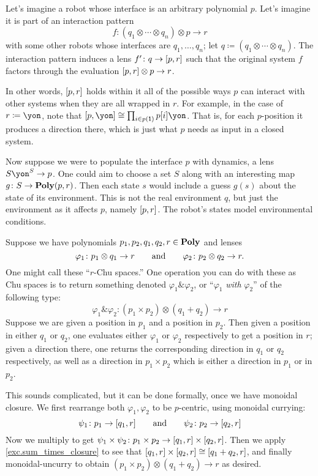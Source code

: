 \documentclass[Book-Poly]{subfiles}
\begin{document}
\begin{example}
Let's imagine a robot whose interface is an arbitrary polynomial $p$. Let's imagine it is part of an interaction pattern
\[
	f\colon (q_1\otimes\cdots\otimes q_n)\otimes p\to r
\]
with some other robots whose interfaces are $q_1,\ldots,q_n$; let $q\coloneqq(q_1\otimes\cdots\otimes q_n)$. The interaction pattern induces a lens $f'\colon q\to [p,r]$ such that the original system $f$ factors through the evaluation $[p,r]\otimes p\to r$.

In other words, $[p,r]$ holds within it all of the possible ways $p$ can interact with other systems when they are all wrapped in $r$.
For example, in the case of $r\coloneqq\yon$, note that $\ihom{p,\yon}\cong\prod_{i\in p(\1)}p[i]\yon$.
That is, for each $p$-position it produces a direction there, which is just what $p$ needs as input in a closed system.


Now suppose we were to populate the interface $p$ with dynamics, a lens $S\yon^S\to p$. One could aim to choose a set $S$ along with an interesting map $g\colon S\to\mathbf{Poly}(p,r)$. Then each state $s$ would include a guess $g(s)$ about the state of its environment. This is not the real environment $q$, but just the environment as it affects $p$, namely $[p,r]$. The robot's states model environmental conditions.
\end{example}

\begin{example}[Chu $\&$]
Suppose we have polynomials $p_1,p_2,q_1,q_2,r\in\mathbf{Poly}$ and lenses
\[
	\varphi_1\colon p_1\otimes q_1\to r
	\qquad\text{and}\qquad
	\varphi_2\colon p_2\otimes q_2\to r.
\]
One might call these ``$r$-Chu spaces.'' One operation you can do with these as Chu spaces is to return something denoted $\varphi_1\&\varphi_2$, or ``$\varphi_1$ \emph{with} $\varphi_2$'' of the following type:
\[
\varphi_1\&\varphi_2\colon (p_1\times p_2)\otimes (q_1+q_2)\to r
\]
Suppose we are given a position in $p_1$ and a position in $p_2$. Then given a position in either $q_1$ or $q_2$, one evaluates either $\varphi_1$ or $\varphi_2$ respectively to get a position in $r$; given a direction there, one returns the corresponding direction in $q_1$ or $q_2$ respectively, as well as a direction in $p_1\times p_2$ which is either a direction in $p_1$ or in $p_2$.

This sounds complicated, but it can be done formally, once we have monoidal closure. We first rearrange both $\varphi_1,\varphi_2$ to be $p$-centric, using monoidal currying:
\[
\psi_1\colon p_1\to [q_1,r]
\qquad\text{and}\qquad
\psi_2\colon p_2\to [q_2,r]
\]
Now we multiply to get $\psi_1\times\psi_2\colon p_1\times p_2\to[q_1,r]\times[q_2,r]$. Then we apply \cref{exc.sum_times_closure} to see that $[q_1,r]\times[q_2,r]\cong[q_1+q_2,r]$, and finally monoidal-uncurry to obtain $(p_1\times p_2)\otimes(q_1+q_2)\to r$ as desired.
\end{example}
\end{document}
